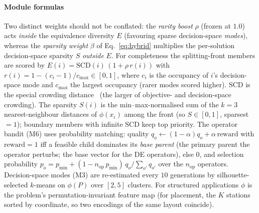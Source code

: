 \paragraph{Module formulas} Two distinct weights should not be conflated: the
\emph{rarity boost} $\rho$ (frozen at $1.0$) acts \emph{inside} the equivalence
diversity $E$ (favouring sparse decision-space \emph{modes}), whereas the \emph{sparsity
weight} $\beta$ of Eq.~\eqref{eq:hybrid} multiplies the per-solution decision-space sparsity
$S$ \emph{outside} $E$. For completeness the splitting-front members are scored by
$E(i)=\mathrm{SCD}(i)\,(1+\rho\,r(i))$ with
$r(i)=1-(c_i-1)/c_{\max}\in[0,1]$, where $c_i$ is the occupancy of $i$'s decision-space mode
and $c_{\max}$ the largest occupancy (rarer modes scored higher). $\mathrm{SCD}$ is the
special crowding distance~\parencite{yue2018moring} (the larger of objective- and decision-space
crowding). The sparsity $S(i)$ is the min--max-normalised sum of the $k{=}3$ nearest-neighbour
distances of $\phi(x_i)$ among the front (so $S\in[0,1]$, sparsest $=1$); boundary members
with infinite $\mathrm{SCD}$ keep top priority. The operator bandit (M6) uses
probability matching: quality $q_o\leftarrow(1-\alpha)q_o+\alpha\,\mathrm{reward}$ with
$\mathrm{reward}=1$ iff a feasible child dominates its \emph{base parent} (the primary parent the
operator perturbs; the base vector for the DE operators), else $0$, and selection
probability $p_o=p_{\min}+(1-n_{\mathrm{op}}\,p_{\min})\,q_o/\sum_{o'}q_{o'}$ over the
$n_{\mathrm{op}}$ operators. Decision-space modes (M3) are
re-estimated every $10$ generations by silhouette-selected $k$-means on $\phi(P)$ over
$[2,5]$ clusters. For structured applications $\phi$ is the problem's permutation-invariant
feature map (for placement, the $K$ stations sorted by coordinate, so two encodings of the
same layout coincide).

